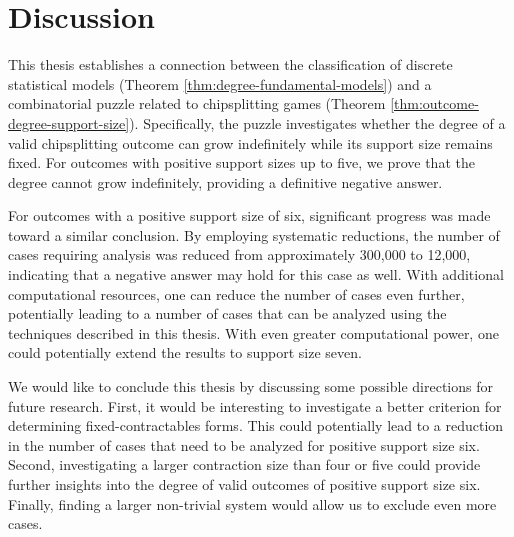 \chapter{Discussion}

This thesis establishes a connection between the classification of discrete statistical models (Theorem \ref{thm:degree-fundamental-models}) and a combinatorial puzzle related to chipsplitting games (Theorem \ref{thm:outcome-degree-support-size}). Specifically, the puzzle investigates whether the degree of a valid chipsplitting outcome can grow indefinitely while its support size remains fixed. For outcomes with positive support sizes up to five, we prove that the degree cannot grow indefinitely, providing a definitive negative answer.

For outcomes with a positive support size of six, significant progress was made toward a similar conclusion. By employing systematic reductions, the number of cases requiring analysis was reduced from approximately 300,000 to 12,000, indicating that a negative answer may hold for this case as well. With additional computational resources, one can reduce the number of cases even further, potentially leading to a number of cases that can be analyzed using the techniques described in this thesis. With even greater computational power, one could potentially extend the results to support size seven.

We would like to conclude this thesis by discussing some possible directions for future research. First, it would be interesting to investigate a better criterion for determining fixed-contractables forms. This could potentially lead to a reduction in the number of cases that need to be analyzed for positive support size six. Second, investigating a larger contraction size than four or five could provide further insights into the degree of valid outcomes of positive support size six. Finally, finding a larger non-trivial system would allow us to exclude even more cases.